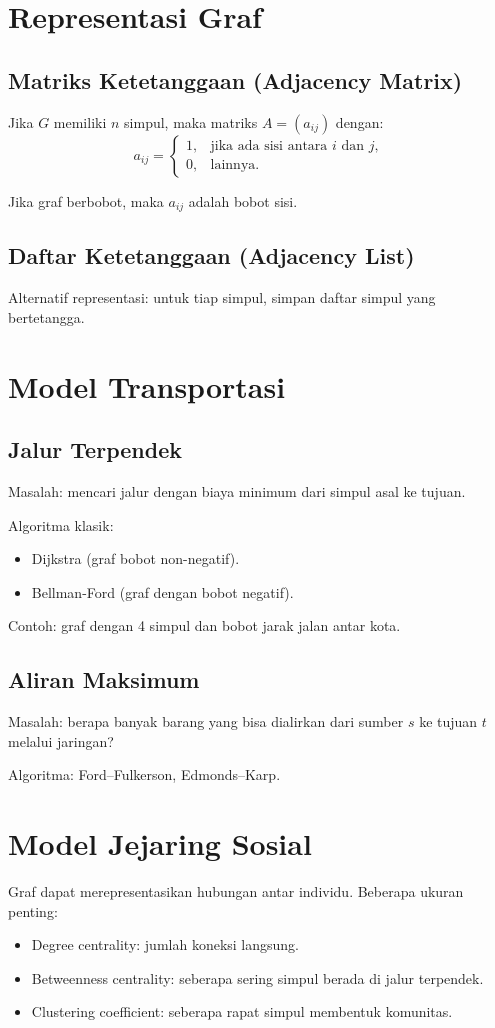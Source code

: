 \documentclass{bukumjh}
\begin{document}
\section{Representasi Graf}
\subsection{Matriks Ketetanggaan (Adjacency Matrix)}
Jika $G$ memiliki $n$ simpul, maka matriks $A=(a_{ij})$ dengan:
\[
a_{ij} = \begin{cases}
1, & \text{jika ada sisi antara } i \text{ dan } j,\\
0, & \text{lainnya}.
\end{cases}
\]

Jika graf berbobot, maka $a_{ij}$ adalah bobot sisi.

\subsection{Daftar Ketetanggaan (Adjacency List)}
Alternatif representasi: untuk tiap simpul, simpan daftar simpul yang bertetangga.

\section{Model Transportasi}
\subsection{Jalur Terpendek}
Masalah: mencari jalur dengan biaya minimum dari simpul asal ke tujuan.

Algoritma klasik:
\begin{itemize}
    \item Dijkstra (graf bobot non-negatif).
    \item Bellman-Ford (graf dengan bobot negatif).
\end{itemize}

Contoh: graf dengan 4 simpul dan bobot jarak jalan antar kota.

\subsection{Aliran Maksimum}
Masalah: berapa banyak barang yang bisa dialirkan dari sumber $s$ ke tujuan $t$ melalui jaringan?

Algoritma: Ford–Fulkerson, Edmonds–Karp.

\section{Model Jejaring Sosial}
Graf dapat merepresentasikan hubungan antar individu. Beberapa ukuran penting:
\begin{itemize}
    \item {\jsg Degree centrality}: jumlah koneksi langsung.
    \item {\jsg Betweenness centrality}: seberapa sering simpul berada di jalur terpendek.
    \item {\jsg Clustering coefficient}: seberapa rapat simpul membentuk komunitas.
\end{itemize}
\end{document}
